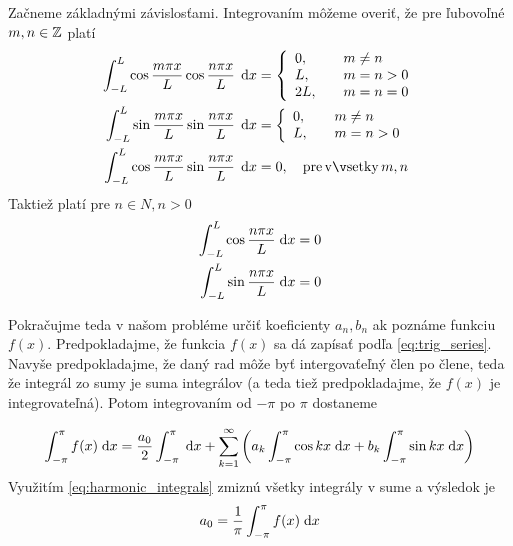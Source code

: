 Začneme základnými závislosťami. Integrovaním môžeme overiť, že pre
ľubovoľné $m,n \in \mathbb{Z}$ platí
\begin{equation}
\begin{split}
     \intLL \cos \frac{m \pi x}{L} 
     \cos\frac{n \pi x}{L}\, \dd x &= 
     \left\{
        \begin{array}{l l}
            0,& \quad m\not=n \\
            L,& \quad m=n>0 \\
            2L,& \quad m=n=0
        \end{array}
     \right. \\
     \intLL \sin \frac{m \pi x}{L} 
     \sin\frac{n \pi x}{L}\, \dd x &= 
     \left\{
        \begin{array}{l l}
            0,& \quad m\not=n \\
            L,& \quad m=n > 0
        \end{array}    
     \right. \\
     \intLL \cos \frac{m \pi x}{L}
     \sin \frac{n \pi x}{L}\, \dd x &= 0,
        \quad {\rm pre\, všetky\,} m,n
        \label{eq:basic_orthogonality}
\end{split}
\end{equation}
Taktiež platí pre $n \in N, n>0$
\begin{equation}
\begin{split}
     \int_{-L}^{L} \cos \frac{n \pi x}{L} \; \mathrm{d} x = {}& 0\\
     \int_{-L}^{L} \sin \frac{n \pi x}{L} \; \mathrm{d} x = {}& 0 
    \label{eq:harmonic_integrals}
\end{split}    
\end{equation}


Pokračujme teda v našom probléme určiť koeficienty $a_n,b_n$ ak
poznáme funkciu $f(x)$.
Predpokladajme, že funkcia $f(x)$ sa dá zapísať podľa
\ref{eq:trig_series}. Navyše predpokladajme, že daný rad môže byť
intergovaťeľný člen po člene, teda že integrál zo sumy je suma
integrálov (a teda tiež predpokladajme, že $f(x)$ je integrovateľná).
Potom integrovaním od $-\pi$ po $\pi$ dostaneme


\begin{equation}
    \int_{-\pi}^{\pi} f(x) \; \mathrm{d} x = \frac{a_0}{2} \int_{-\pi}^{\pi} \; \mathrm{d} x +
        \sum_{k=1}^{\infty} \left( 
            a_k \int_{-\pi}^{\pi} \cos kx  \; \mathrm{d} x +
            b_k \int_{-\pi}^{\pi} \sin kx  \; \mathrm{d} x
        \right)
\end{equation}
Využitím \ref{eq:harmonic_integrals} zmiznú všetky integrály v sume a
výsledok je
\begin{equation}
   a_0 = \frac{1}{\pi} \int_{-\pi}^{\pi} f(x) \; \mathrm{d} x 
\end{equation}

